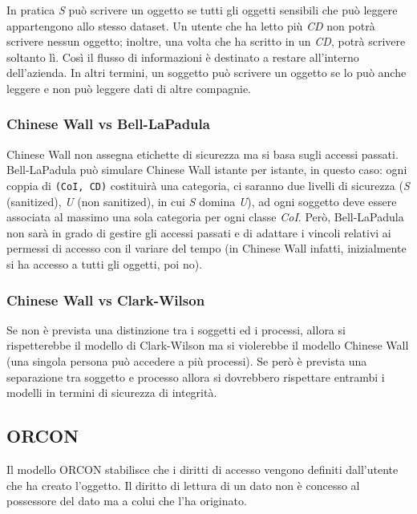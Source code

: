 In pratica \textit{S} può scrivere un oggetto se tutti gli oggetti sensibili
che può leggere appartengono allo stesso dataset. Un utente che ha letto più
\textit{CD} non potrà scrivere nessun oggetto; inoltre, una volta
che ha scritto in un \textit{CD}, potrà scrivere soltanto lì.
Così il flusso di informazioni è destinato a restare all'interno dell'azienda.
In altri termini, un
soggetto può scrivere un oggetto se lo può anche leggere e non può leggere dati
di altre compagnie.

\subsubsection{Chinese Wall vs Bell-LaPadula}

Chinese Wall non assegna etichette di sicurezza
ma si basa sugli accessi passati. Bell-LaPadula può
simulare Chinese Wall istante per istante, in questo
caso: ogni coppia di \verb|(CoI, CD)| costituirà una
categoria, ci saranno due livelli di sicurezza (\textit{S}
(sanitized), \textit{U} (non sanitized), in cui \textit{S} domina \textit{U}),
ad ogni soggetto deve essere associata al massimo
una sola categoria per ogni classe \textit{CoI}. Però,
Bell-LaPadula non sarà in grado di gestire gli
accessi passati e di adattare i vincoli relativi ai
permessi di accesso con il variare del tempo (in
Chinese Wall infatti, inizialmente si ha accesso a
tutti gli oggetti, poi no).

\subsubsection{Chinese Wall vs Clark-Wilson}

Se non è prevista una distinzione tra i soggetti
ed i processi, allora si rispetterebbe il modello
di Clark-Wilson ma si violerebbe il modello
Chinese Wall (una singola persona può
accedere a più processi). Se però è prevista
una separazione tra soggetto e processo allora
si dovrebbero rispettare entrambi i modelli in
termini di sicurezza di integrità.

\subsection{ORCON \normalfont{}}

Il modello ORCON stabilisce che i diritti di accesso vengono definiti
dall'utente che ha creato l'oggetto. Il diritto di lettura di un dato non è
concesso al possessore del dato ma a colui che l'ha
originato.

